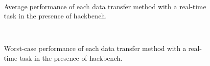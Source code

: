 \begin{figure}[!t]
 \begin{center}
  \\
  \caption{Average performance of each data transfer method with a
  real-time task in the presence of \textsf{hackbench}.}
  \label{fig:average_realtime_hackbench}
 \end{center}
\end{figure}
\begin{figure}
 \begin{center}
  \\
  \caption{Worst-case performance of each data transfer method with a
  real-time task in the presence of \textsf{hackbench}.}
  \label{fig:worst_realtime_hackbench}
 \end{center}
\end{figure}


